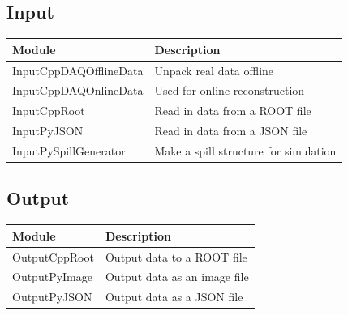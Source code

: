 \documentclass[a4paper,10pt]{article}
\begin{document}
  \subsection{Input}
    \begin{small}
    \noindent
      \renewcommand{\arraystretch}{1.5}
      \begin{tabular}{| l | l |}
        \hline
        \textbf{Module} & \textbf{Description} \\
        \hline
        InputCppDAQOfflineData & Unpack real data offline \\
        InputCppDAQOnlineData & Used for online reconstruction \\
        InputCppRoot & Read in data from a ROOT file \\
        InputPyJSON & Read in data from a JSON file \\
        InputPySpillGenerator & Make a spill structure for simulation \\
        \hline
      \end{tabular}
      \renewcommand{\arraystretch}{1.0}
    \end{small}
    
  \subsection{Output}
    \begin{small}
    \noindent
      \renewcommand{\arraystretch}{1.5}
      \begin{tabular}{| l | l |}
        \hline
        \textbf{Module} & \textbf{Description} \\
        \hline
        OutputCppRoot & Output data to a ROOT file \\
        OutputPyImage & Output data as an image file \\
        OutputPyJSON & Output data as a JSON file \\
        \hline
      \end{tabular}
      \renewcommand{\arraystretch}{1.0}
    \end{small}

\end{document}
